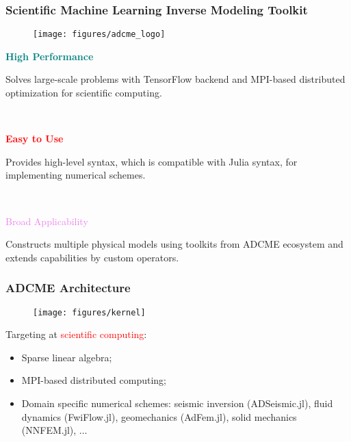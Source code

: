 \documentclass[usenames,dvipsnames]{beamer}
\begin{document}
\begin{frame}
	\frametitle{Scientific Machine Learning Inverse Modeling Toolkit}

	
		\begin{figure}[hbt]
		\centering
  \texttt{[image: figures/adcme\_logo]}
\end{figure}

\begin{minipage}[t]{0.33\textwidth}
	\begin{center}
\textcolor{teal}{\textbf{High Performance}}		
	\end{center}

	
	Solves large-scale problems with TensorFlow backend and MPI-based distributed optimization for scientific computing. 
\end{minipage}~
\begin{minipage}[t]{0.33\textwidth}

\begin{center}
\textcolor{red}{\textbf{Easy to Use}}
	\end{center}

Provides high-level syntax, which is compatible with Julia syntax, for implementing numerical schemes. 
\end{minipage}~
\begin{minipage}[t]{0.33\textwidth}

\begin{center}
\textcolor{violet}{Broad Applicability}
	\end{center}
	
	
Constructs multiple physical models using toolkits from ADCME ecosystem and extends capabilities by custom operators. 
\end{minipage}
\end{frame}
\vspace{-1.0cm}

\begin{frame}
	\frametitle{ADCME Architecture}
	
	\begin{figure}[hbt]
		\centering
  \texttt{[image: figures/kernel]}
\end{figure}
\vspace{-1.0cm}
Targeting at \textcolor{red}{scientific computing}: 
\begin{itemize}
	\item Sparse linear algebra;
	\item MPI-based distributed computing;
	\item Domain specific numerical schemes: seismic inversion (ADSeismic.jl), fluid dynamics (FwiFlow.jl), geomechanics (AdFem.jl), solid mechanics (NNFEM.jl), $\ldots$
\end{itemize}
\end{frame}
\end{document}

